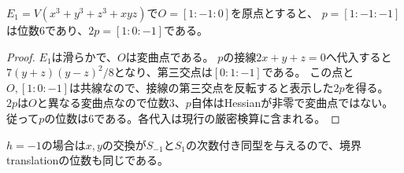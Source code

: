 \begin{lemma}[位数6の具体的な楕円曲線計算]\label{CSBGlem:order-six}
$E_1=V(x^3+y^3+z^3+xyz)$で$O=[1:-1:0]$を原点とすると、
$p=[1:-1:-1]$は位数6であり、$2p=[1:0:-1]$である。
\end{lemma}
\begin{proof}
$E_1$は滑らかで、$O$は変曲点である。
$p$の接線$2x+y+z=0$へ代入すると
$7(y+z)(y-z)^2/8$となり、第三交点は$[0:1:-1]$である。
この点と$O,[1:0:-1]$は共線なので、接線の第三交点を反転すると表示した$2p$を得る。
$2p$は$O$と異なる変曲点なので位数3、$p$自体はHessianが非零で変曲点ではない。
従って$p$の位数は6である。各代入は現行の厳密検算に含まれる。
\end{proof}
$h=-1$の場合は$x,y$の交換が$S_{-1}$と$S_1$の次数付き同型を与えるので、境界translationの位数も同じである。
